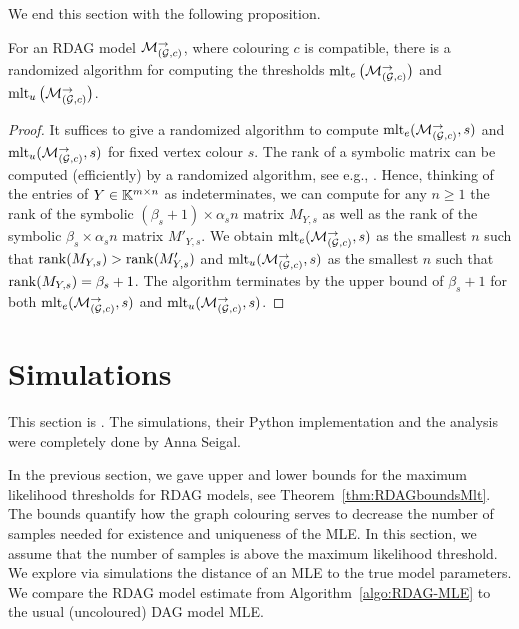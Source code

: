 We end this section with the following proposition.

\begin{prop}  \label{prop:RDAGcomputingMlt}
	For an RDAG model $\mathcal{M}_{(\mathcal{G}, c)}^{\to}$, where colouring $c$ is compatible, there is a randomized algorithm for computing the thresholds $\operatorname{mlt}_e \big(\mathcal{M}_{(\mathcal{G}, c)}^{\to} \big)$ and $\operatorname{mlt}_u \big( \mathcal{M}_{(\mathcal{G}, c)}^{\to} \big)$.
\end{prop}

\begin{proof}
	It suffices to give a randomized algorithm to compute $\operatorname{mlt}_e(\mathcal{M}_{(\mathcal{G}, c)}^{\to},s)$ and $\operatorname{mlt}_u(\mathcal{M}_{(\mathcal{G}, c)}^{\to}, s)$ for fixed vertex colour $s$.
	The rank of a symbolic matrix can be computed (efficiently) by a randomized algorithm, see e.g., \cite{lovasz1979onDeterminants, schwartz1980fast}. Hence, thinking of the entries of $Y \in \mathbb K^{m \times n}$ as indeterminates, we can compute for any $n \geq 1$ the rank of the symbolic $(\beta_s + 1) \times \alpha_s n$ matrix $M_{Y,s}$ as well as the rank of the symbolic $\beta_s \times \alpha_s n$ matrix $M'_{Y,s}$. We obtain $\operatorname{mlt}_e(\mathcal{M}_{(\mathcal{G}, c)}^{\to},s)$ as the smallest $n$ such that $\operatorname{rank} (M_{Y,s}) > \operatorname{rank}(M'_{Y,s})$ and $\operatorname{mlt}_u(\mathcal{M}_{(\mathcal{G}, c)}^{\to}, s)$ as the smallest $n$ such that $\operatorname{rank} (M_{Y,s}) = \beta_s + 1$. The algorithm terminates by the upper bound of $\beta_s + 1$ for both $\operatorname{mlt}_e(\mathcal{M}_{(\mathcal{G}, c)}^{\to}, s)$ and $\operatorname{mlt}_u(\mathcal{M}_{(\mathcal{G}, c)}^{\to}, s)$.
\end{proof}



\section{Simulations}\label{sec:SimulationsRDAG}


This section is \cite[Section~6]{RDAG}. The simulations, their Python implementation and the analysis were completely done by Anna Seigal.

In the previous section, we gave upper and lower bounds for the maximum likelihood thresholds for RDAG models, see Theorem~\ref{thm:RDAGboundsMlt}. The bounds quantify how the graph colouring serves to decrease the number of samples needed for existence and uniqueness of the MLE. In this section, we 
assume that the number of samples is above the maximum likelihood threshold. We
explore via simulations the distance of an MLE to the true model parameters.
We compare the RDAG model estimate 
from Algorithm~\ref{algo:RDAG-MLE} to the usual (uncoloured) DAG model MLE.


